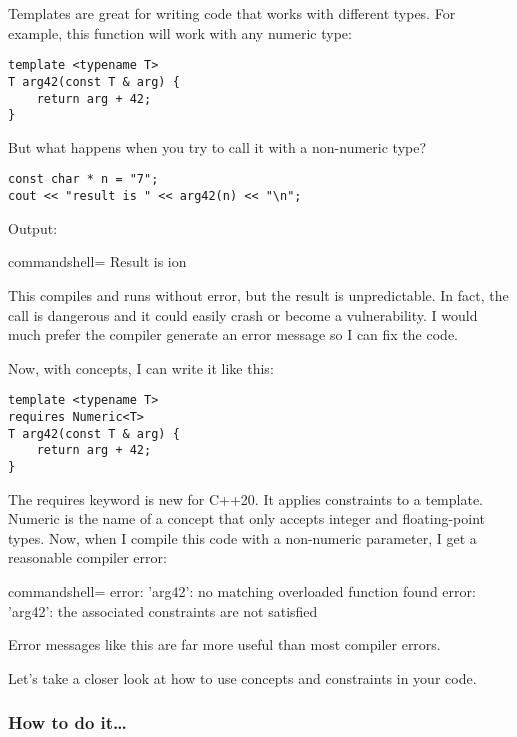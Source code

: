 
Templates are great for writing code that works with different types. For example, this function will work with any numeric type:

\begin{lstlisting}[style=styleCXX]
template <typename T>
T arg42(const T & arg) {
	return arg + 42;
}
\end{lstlisting}

But what happens when you try to call it with a non-numeric type?

\begin{lstlisting}[style=styleCXX]
const char * n = "7";
cout << "result is " << arg42(n) << "\n";
\end{lstlisting}

Output:

\begin{tcblisting}{commandshell={}}
Result is ion
\end{tcblisting}

This compiles and runs without error, but the result is unpredictable. In fact, the call is dangerous and it could easily crash or become a vulnerability. I would much prefer the compiler generate an error message so I can fix the code.

Now, with concepts, I can write it like this:

\begin{lstlisting}[style=styleCXX]
template <typename T>
requires Numeric<T>
T arg42(const T & arg) {
	return arg + 42;
}
\end{lstlisting}

The requires keyword is new for C++20. It applies constraints to a template. Numeric is the name of a concept that only accepts integer and floating-point types. Now, when I compile this code with a non-numeric parameter, I get a reasonable compiler error:

\begin{tcblisting}{commandshell={}}
error: 'arg42': no matching overloaded function found
error: 'arg42': the associated constraints are not satisfied
\end{tcblisting}

Error messages like this are far more useful than most compiler errors.

Let's take a closer look at how to use concepts and constraints in your code.


\subsubsection{How to do it…}

